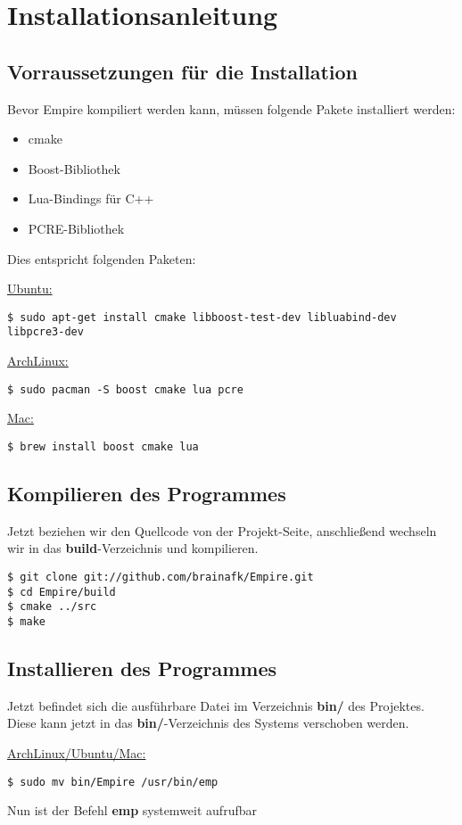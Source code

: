 
\section{Installationsanleitung}

\subsection{Vorraussetzungen für die Installation}
Bevor Empire kompiliert werden kann, müssen folgende Pakete installiert werden:

\begin{itemize}
	\item cmake
	\item Boost-Bibliothek
	\item Lua-Bindings für C++
	\item PCRE-Bibliothek
\end{itemize}

Dies entspricht folgenden Paketen:

\underline{Ubuntu:}
\begin{lstlisting}[style=Bash]
$ sudo apt-get install cmake libboost-test-dev libluabind-dev libpcre3-dev
\end{lstlisting}

\underline{ArchLinux:}
\begin{lstlisting}[style=Bash]
$ sudo pacman -S boost cmake lua pcre
\end{lstlisting}

\underline{Mac:}
\begin{lstlisting}[style=Bash]
$ brew install boost cmake lua
\end{lstlisting}

\subsection{Kompilieren des Programmes}

Jetzt beziehen wir den Quellcode von der Projekt-Seite, anschließend wechseln wir in das \textbf{build}-Verzeichnis und kompilieren.

\begin{lstlisting}[style=Bash]
$ git clone git://github.com/brainafk/Empire.git
$ cd Empire/build
$ cmake ../src
$ make
\end{lstlisting}

\subsection{Installieren des Programmes}

Jetzt befindet sich die ausführbare Datei im Verzeichnis \textbf{bin/} des Projektes. Diese kann jetzt in das \textbf{bin/}-Verzeichnis des Systems verschoben werden.

\underline{ArchLinux/Ubuntu/Mac:}
\begin{lstlisting}[style=Bash]
$ sudo mv bin/Empire /usr/bin/emp
\end{lstlisting}

Nun ist der Befehl \textbf{emp} systemweit aufrufbar
